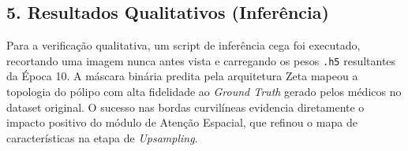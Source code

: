 ﻿\documentclass{article}
\begin{document}
\subsection*{5. Resultados Qualitativos (Inferência)}
Para a verificação qualitativa, um script de inferência cega foi executado, recortando uma imagem nunca antes vista e carregando os pesos \texttt{.h5} resultantes da Época 10. A máscara binária predita pela arquitetura Zeta mapeou a topologia do pólipo com alta fidelidade ao \textit{Ground Truth} gerado pelos médicos no dataset original. O sucesso nas bordas curvilíneas evidencia diretamente o impacto positivo do módulo de Atenção Espacial, que refinou o mapa de características na etapa de \textit{Upsampling}.
\end{document}
